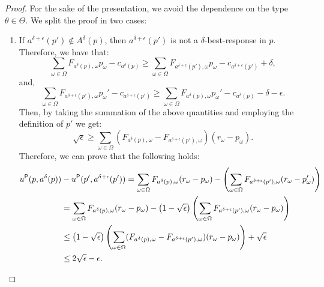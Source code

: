 \begin{proof}
	For the sake of the presentation, we avoid the dependence on the type $\theta \in \Theta$.
	We split the proof in two cases: 
	\begin{enumerate}
		\item If $a^{\delta+\epsilon} (p') \not \in {A}^{\delta}(p)$, then $a^{\delta+\epsilon} (p')$ is not a $\delta$-best-response in $p$. Therefore, we have that:
		\begin{equation*}	
			\sum_{\omega \in \Omega} F_{ a^{\delta}(p),\omega} p_\omega - c_{ a^{\delta}(p)} \ge \sum_{\omega \in \Omega}F_{ a^{\delta+\epsilon}(p'),\omega} p_\omega - c_{ a^{\delta+\epsilon}(p')} + {\delta },
		\end{equation*}
		and, 
		\begin{equation*}	
			\sum_{\omega \in \Omega}F_{ a^{\delta+\epsilon}(p'),\omega} p_\omega' - c_{ a^{\delta+\epsilon}(p')}  \ge \sum_{\omega \in \Omega} F_{ a^{\delta}(p),\omega} p_\omega' - c_{ a^{\delta}(p)} - {\delta - \epsilon }.
		\end{equation*}
		Then, by taking the summation of the above quantities and employing the definition of $p'$  we get:
		\begin{equation*}	
			\sqrt \epsilon \ge \sum_{\omega \in \Omega} (F_{ a^{\delta}(p),\omega} - F_{ a^{\delta + \epsilon}(p'),\omega}) (r_\omega-p_\omega).
		\end{equation*}
		Therefore, we can prove that the following holds:
		\begin{align*}	
			u^\sfP(p,a^{\delta}(p)) & - u^\sfP(p',a^{\delta+ \epsilon}(p'))  = \sum_{\omega \in \Omega}F_{ a^{\delta}(p),\omega} (r_\omega - p_\omega ) - \left(\sum_{\omega \in \Omega}F_{ a^{\delta+\epsilon}(p'),\omega}(r_\omega - p_\omega' )  \right)\\
			&= \sum_{\omega \in \Omega}F_{ a^{\delta}(p),\omega} (r_\omega - p_\omega ) - \left(1 -\sqrt{\epsilon}\right) \left(\sum_{\omega \in \Omega}F_{ a^{\delta+\epsilon}(p'),\omega}(r_\omega - p_\omega)  \right)\\
			&\le \left(1 -\sqrt{\epsilon}\right) \left(\sum_{\omega \in \Omega} (F_{ a^{\delta}(p),\omega} - F_{ a^{\delta+\epsilon}(p'),\omega})(r_\omega - p_\omega)  \right) + \sqrt{\epsilon} \\
			&\le 2 \sqrt{\epsilon} - \epsilon.

\end{align*}
\end{enumerate}
\end{proof}
